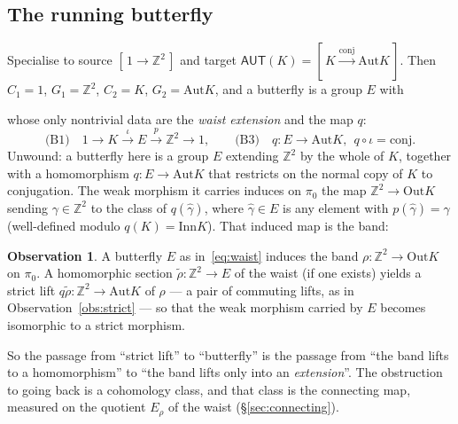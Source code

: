 \documentclass[11pt]{article}
\theoremstyle{definition}
\newtheorem{observation}[theorem]{Observation}
\newcommand{\Z}{\mathbb{Z}}
\newcommand{\Aut}{\mathrm{Aut}}
\newcommand{\Inn}{\mathrm{Inn}}
\newcommand{\Out}{\mathrm{Out}}
\newcommand{\conj}{\mathrm{conj}}
\newcommand{\AUT}{\mathsf{AUT}}
\newcommand{\pizero}{\pi_0}
\begin{document}
\subsection{The running butterfly}

Specialise to source $[\,1\to\Z^2\,]$ and target $\AUT(K)=[\,K\xrightarrow{\conj}\Aut K\,]$. Then
$C_1=1$, $G_1=\Z^2$, $C_2=K$, $G_2=\Aut K$, and a butterfly is a group $E$ with
\begin{center}
\end{center}
whose only nontrivial data are the \emph{waist extension} and the map $q$:
\begin{equation}\label{eq:waist}
\text{(B1)}\quad 1\to K\xrightarrow{\ \iota\ }E\xrightarrow{\ p\ }\Z^2\to1,
\qquad
\text{(B3)}\quad q\colon E\to\Aut K,\ \ q\circ\iota=\conj.
\end{equation}
Unwound: a butterfly here is a group $E$ extending $\Z^2$ by the whole of $K$, together with a
homomorphism $q\colon E\to\Aut K$ that restricts on the normal copy of $K$ to conjugation. The
weak morphism it carries induces on $\pizero$ the map $\Z^2\to\Out K$ sending $\gamma\in\Z^2$ to
the class of $q(\hat\gamma)$, where $\hat\gamma\in E$ is any element with $p(\hat\gamma)=\gamma$
(well-defined modulo $q(K)=\Inn K$). That induced map is the band:

\begin{observation}\label{obs:butterfly-band}
A butterfly $E$ as in~\eqref{eq:waist} induces the band $\rho\colon\Z^2\to\Out K$ on $\pizero$. A
homomorphic section $\tilde\rho\colon\Z^2\to E$ of the waist (if one exists) yields a strict lift
$q\tilde\rho\colon\Z^2\to\Aut K$ of $\rho$ --- a pair of commuting lifts, as in
Observation~\ref{obs:strict} --- so that the weak morphism carried by $E$ becomes isomorphic to a
strict morphism.
\end{observation}

So the passage from ``strict lift'' to ``butterfly'' is the passage from ``the band lifts to a
homomorphism'' to ``the band lifts only into an \emph{extension}''. The obstruction to going back
is a cohomology class, and that class is the connecting map, measured on the quotient $E_\rho$ of
the waist (\S\ref{sec:connecting}).
\end{document}
